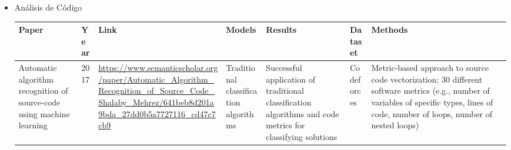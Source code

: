 \documentclass{article}
\begin{document}
\begin{itemize}
\begin{longtable}{|p{2cm}|p{0.8cm}|p{2cm}|p{2cm}|p{3cm}|p{2cm}|p{3cm}|}
              \hline
              
          \end{longtable}
          
    \item Análisis de Código
          
          \begin{longtable}{|p{2cm}|p{0.8cm}|p{2cm}|p{2cm}|p{3cm}|p{2cm}|p{3cm}|}
              \hline
              \textbf{Paper} & \textbf{Year}                                                                                                                                                                                                                                                                                               & \textbf{Link} & \textbf{Models} & \textbf{Results} & \textbf{Dataset} & \textbf{Methods} \\
              \hline
              \endfirsthead
              
              \hline
              \endfoot
              
              \hline
              \endlastfoot
              
              
              Automatic algorithm recognition of source-code using machine
              learning
                             & 2017
                             & \href{https://www.semanticscholar.org/paper/Automatic_Algorithm_Recognition_of_Source_Code_Shalaby_Mehrez/641beb8d201a9bda_27dd0b5a7727116_cd47c7cb9}{\url{https://www.semanticscholar.org/paper/Automatic_Algorithm_Recognition_of_Source_Code_Shalaby_Mehrez/641beb8d201a9bda_27dd0b5a7727116_cd47c7cb9}}

              
              
              
              
              
                             & Traditional classification algorithms 
                             & Successful application of traditional classification algorithms and code metrics for classifying solutions 
                             & Codeforces 
                             & Metric-based approach to source code vectorization; 30 different software metrics (e.g., number of variables of specific types, lines of code, number of loops, number of nested loops)                                                                                                                                                                                                                \\
              

\end{longtable}
\end{itemize}
\end{document}
